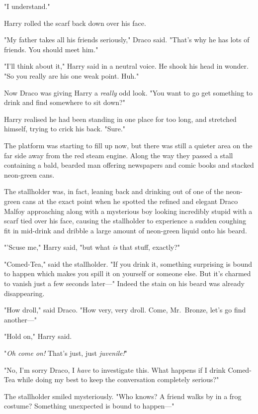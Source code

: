 "I understand."

Harry rolled the scarf back down over his face.

"My father takes all his friends seriously," Draco said. "That's why he has 
lots of friends. You should meet him."

"I'll think about it," Harry said in a neutral voice. He shook his head in 
wonder. "So you really are his one weak point. Huh."

Now Draco was giving Harry a \emph{really} odd look. "You want to go get 
something to drink and find somewhere to sit down?"

Harry realised he had been standing in one place for too long, and stretched 
himself, trying to crick his back. "Sure."

The platform was starting to fill up now, but there was still a quieter area on 
the far side away from the red steam engine. Along the way they passed a stall 
containing a bald, bearded man offering newspapers and comic books and stacked 
neon-green cans.

The stallholder was, in fact, leaning back and drinking out of one of the 
neon-green cans at the exact point when he spotted the refined and elegant 
Draco Malfoy approaching along with a mysterious boy looking incredibly stupid 
with a scarf tied over his face, causing the stallholder to experience a sudden 
coughing fit in mid-drink and dribble a large amount of neon-green liquid onto 
his beard.

"'Scuse me," Harry said, "but what \emph{is} that stuff, exactly?"

"Comed-Tea," said the stallholder. "If you drink it, something surprising is 
bound to happen which makes you spill it on yourself or someone else. But it's 
charmed to vanish just a few seconds later---" Indeed the stain on his beard 
was already disappearing.

"How droll," said Draco. "How very, very droll. Come, Mr.~Bronze, let's go find 
another---"

"Hold on," Harry said.

"\emph{Oh come on!} That's just, just \emph{juvenile!}"

"No, I'm sorry Draco, I \emph{have} to investigate this. What happens if I 
drink Comed-Tea while doing my best to keep the conversation completely 
serious?"

The stallholder smiled mysteriously. "Who knows? A friend walks by in a frog 
costume? Something unexpected is bound to happen---"

